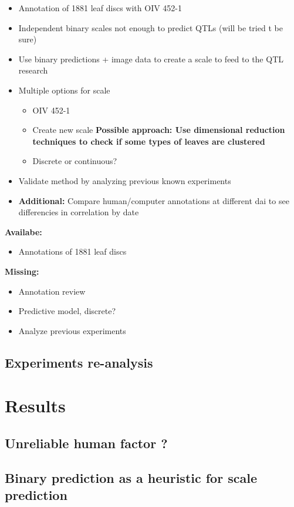 \documentclass[english]{article}
\begin{document}
\begin{itemize}
	\item Annotation of 1881 leaf discs with OIV 452-1
	\item Independent binary scales not enough to predict QTLs (will be tried t be sure)
	\item Use binary predictions + image data to create a scale to feed to the QTL research
	\item Multiple options for scale
	      \begin{itemize}
		      \item OIV 452-1
		      \item Create new scale \textbf{Possible approach: Use dimensional reduction techniques to check if some types of leaves are clustered}
		      \item Discrete or continuous?
	      \end{itemize}
	\item Validate method by analyzing previous known experiments
	\item \textbf{Additional:} Compare human/computer annotations at different dai to see differencies in correlation by date
\end{itemize}

\textbf{Availabe:}
\begin{itemize}
	\item Annotations of 1881 leaf discs
\end{itemize}
\textbf{Missing:}
\begin{itemize}
	\item Annotation review
	\item Predictive model, discrete?
	\item Analyze previous experiments
\end{itemize}

\subsection{Experiments re-analysis}

\section{Results}

\subsection{Unreliable human factor \textbf{?}}

\subsection{Binary prediction as a heuristic for scale prediction}
\end{document}
